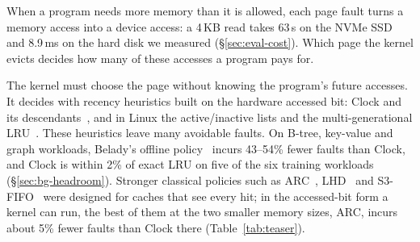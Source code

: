 \documentclass{article}
\newcommand{\clock}{Clock\xspace}
\newcommand{\belady}{Belady\xspace}
\begin{document}
When a program needs more memory than it is allowed, each page fault turns a memory
access into a device access: a 4\,KB read takes 63\,\textmu s on the NVMe SSD and
8.9\,ms on the hard disk we measured (\S\ref{sec:eval-cost}). Which page the kernel
evicts decides how many of these accesses a program pays for.

The kernel must choose the page without knowing the program's future accesses. It
decides with recency heuristics built on the hardware accessed bit: \clock and its
descendants~\citep{corbato1968paging,carr1981wsclock}, and in Linux the active/inactive
lists and the multi-generational LRU~\citep{linux_mglru}. These heuristics leave many
avoidable faults. On B-tree, key-value and graph workloads, \belady's offline
policy~\citep{belady1966study} incurs 43--54\% fewer faults than \clock, and \clock is
within 2\% of exact LRU on five of the six training workloads (\S\ref{sec:bg-headroom}).
Stronger classical policies such as ARC~\citep{megiddo2003arc},
LHD~\citep{beckmann2018lhd} and S3-FIFO~\citep{yang2023s3fifo} were designed for caches
that see every hit; in the accessed-bit form a kernel can run, the best of them at the two
smaller memory sizes, ARC, incurs about 5\% fewer faults than \clock there
(Table~\ref{tab:teaser}).
\end{document}
